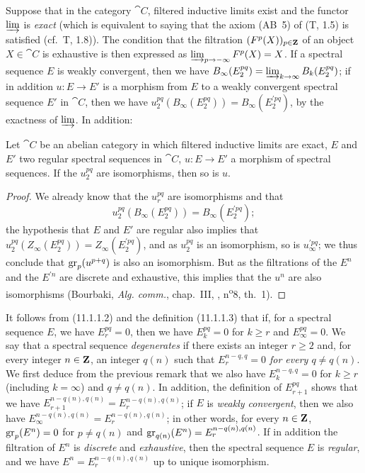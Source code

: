 \begin{env}[11.1.4]
\label{0.11.1.4}
Suppose that in the category $\cat{C}$, filtered inductive limits exist and the functor $\varinjlim$ is \emph{exact} (which is equivalent to saying that the axiom (AB~5) of (T, 1.5) is satisfied (cf.~T, 1.8)).
The condition that the filtration $(F^p(X))_{p\in\mathbf{Z}}$ of an object $X\in\cat{C}$ is exhaustive is then expressed as $\varinjlim_{p\to-\infty}F^p(X)=X$.
If a spectral sequence $E$ is weakly convergent, then we have $B_\infty(E_2^{pq})=\varinjlim_{k\to\infty}B_k(E_2^{pq})$; if in addition $u:E\to E'$ is a morphism from $E$ to a weakly convergent spectral sequence $E'$ in $\cat{C}$, then we have $u_2^{pq}(B_\infty(E_2^{pq}))=B_\infty(E_2^{\prime pq})$, by the exactness of $\varinjlim$.
In addition:
\end{env}

\begin{proposition}[11.1.5]
\label{0.11.1.5}
Let $\cat{C}$ be an abelian category in which filtered inductive limits are exact, $E$ and $E'$ two regular spectral sequences in $\cat{C}$, $u:E\to E'$ a morphism of spectral sequences.
If the $u_2^{pq}$ are isomorphisms, then so is $u$.
\end{proposition}

\begin{proof}
We already know  that the $u_r^{pq}$ are isomorphisms and that
\[
  u_2^{pq}(B_\infty(E_2^{pq}))=B_\infty(E_2^{\prime pq});
\]
the hypothesis that $E$ and $E'$ are regular also implies that $u_2^{pq}(Z_\infty(E_2^{pq}))=Z_\infty(E_2^{\prime pq})$, and as $u_2^{pq}$ is an isomorphism, so is $u_\infty^{\prime pq}$; we thus conclude that $\operatorname{gr}_p(u^{p+q})$ is also an isomorphism.
But as the filtrations of the $E^n$ and the $E^{\prime n}$ are discrete and exhaustive, this implies that the $u^n$ are also isomorphisms (Bourbaki, \emph{Alg. comm.}, chap.~III, , n\textsuperscript{o}8, th.~1).
\end{proof}

\begin{env}[11.1.6]
\label{0.11.1.6}
It follows from (11.1.1.2) and the definition (11.1.1.3) that if, for a spectral sequence $E$, we have $E_r^{pq}=0$, then we have $E_k^{pq}=0$ for $k\geq r$ and $E_\infty^{pq}=0$.
We say that a spectral sequence \emph{degenerates} if there exists an integer $r\geq 2$ and, for every integer $n\in\mathbf{Z}$, an integer $q(n)$ such that \emph{$E_r^{n-q,q}=0$ for every $q\neq q(n)$}.
We first deduce from the previous remark that we also have $E_k^{n-q,q}=0$ for $k\geq r$ (including $k=\infty$) and $q\neq q(n)$.
In addition, the definition of $E_{r+1}^{pq}$ shows that we have $E_{r+1}^{n-q(n),q(n)}=E_r^{n-q(n),q(n)}$; if $E$ is \emph{weakly convergent}, then we also have $E_\infty^{n-q(n),q(n)}=E_r^{n-q(n),q(n)}$; in other words, for every $n\in\mathbf{Z}$, $\operatorname{gr}_p(E^n)=0$ for $p\neq q(n)$ and $\operatorname{gr}_{q(n)}(E^n)=E_r^{n-q(n),q(n)}$.
If in addition the filtration of $E^n$ is \emph{discrete} and \emph{exhaustive}, then the spectral sequence $E$ is \emph{regular}, and we have $E^n=E_r^{n-q(n),q(n)}$ up to unique isomorphism.
\end{env}

